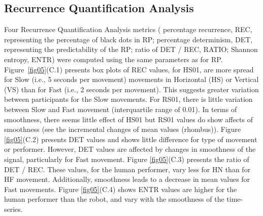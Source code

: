 \documentclass[fleqn,10pt]{wlscirep}
\begin{document}
\subsection*{Recurrence Quantification Analysis} \label{ch6:rqas}
Four Recurrence Quantification Analysis metrics (
percentage recurrence, REC, representing the percentage of black dots in RP; 
percentage determinism, DET, representing the predictability of the RP; 
ratio of DET / REC, RATIO; Shannon entropy, ENTR) 
were computed using the same parameters as for RP.
Figure~\ref{fig05}(C.1) presents box plots of REC values,
for HS01, are more spread for Slow (i.e., 5 seconds per movement) movements 
in Horizontal (HS) or Vertical (VS) than for Fast (i.e., 2 seconds per movement).  
This suggests greater variation between participants for the Slow movements.  
For RS01, there is little variation between Slow and Fast movement
(interquartile range of 0.01). 
In terms of smoothness, there seems little effect of HS01 but RS01 values 
do show affects of smoothness (see the incremental changes of mean values (rhombus)).
Figure \ref{fig05}(C.2) presents DET values and shows
little difference for type of movement or performer.  
However, DET values are affected by changes in smoothness of the signal, 
particularly for Fast movement.
Figure \ref{fig05}(C.3) presents the ratio of DET / REC.
These values, for the human performer, vary less for HN than for HF movement.  
Additionally, smoothness leads to a decrease in mean values for Fast movements.
Figure \ref{fig05}(C.4) shows ENTR values are higher for the human
performer than the robot, and vary with the smoothness of the time-series.
\end{document}
